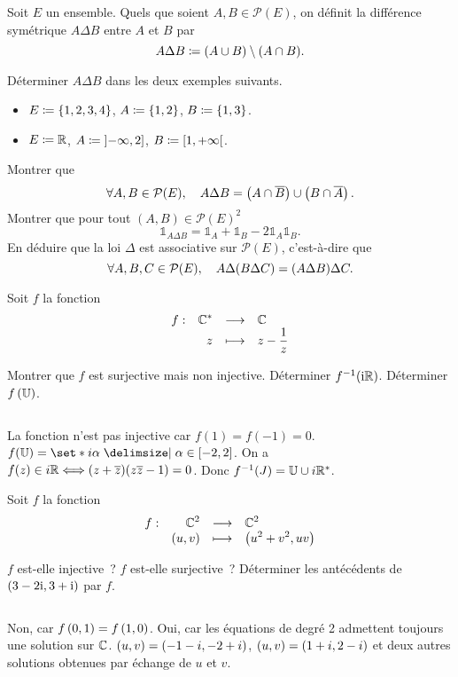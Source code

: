\documentclass{magnolia}
\begin{document}
Soit $E$ un ensemble. Quels que soient $A,B\in\mathcal{P}(E)$, on définit
la différence symétrique $A\Delta B$ entre $A$ et $B$ par
\[A\Delta B\coloneqq(A\cup B)\setminus(A\cap B).\]
\begin{questions}
\question Déterminer $A\Delta B$ dans les deux exemples suivants.
\begin{itemize}
\item $E\coloneqq\left\{1,2,3,4\right\}$, $A\coloneqq\left\{1, 2\right\}$, $B\coloneqq\left\{1, 3\right\}$.
\item $E\coloneqq\mathbb{R}$, $A\coloneqq\left]-\infty,2\right]$, $B\coloneqq\left[1,+\infty\right[$.
\end{itemize}
\question Montrer que
\[\forall A,B\in\mathcal{P}(E),\quad A\Delta B=\left(A\cap\overline{B}\right)\cup\left(B\cap\overline{A}\right).\]
\question Montrer que pour tout $(A,B)\in\mathcal{P}(E)^2$
\[\mathds{1}_{A\Delta B}=\mathds{1}_A + \mathds{1}_B - 2 \mathds{1}_A \mathds{1}_B.\]
\question En déduire que la loi $\Delta$ est associative sur $\mathcal{P}(E)$,
  c'est-à-dire que
	\[\forall A,B,C\in\mathcal{P}(E),\quad A\Delta(B\Delta C)=(A\Delta B)\Delta C.\]
\end{questions}

Soit $f$ la fonction
\[\begin{array}[t]{lrcl} \displaystyle{f} : & \displaystyle{\mathbb{C}^*} & \longrightarrow & \displaystyle{\mathbb{C}} \\ & \displaystyle{z} & \longmapsto & \displaystyle{z-\frac{1}{z}} \end{array}\]
\begin{questions}
\question Montrer que $f$ est surjective mais non injective.
\question Déterminer $f^{-1}({\rm i}\mathbb{R})$.
\question Déterminer $f\p{\U}$.
\end{questions}
\begin{sol}
$\quad$
\begin{questions}
\question La fonction n'est pas injective car $f(1)=f(-1)=0$.
\question $f(\U)=\enstq{i\alpha}{\alpha\in\interf{-2}{2}}$.
\question On a $f(z)\in i\mathbb{R} \Longleftrightarrow (z+\overline{z})(z\overline{z}-1)=0$. Donc
  $f^{-1}(J)=\U\cup i\Rs$.
\end{questions}
\end{sol}

Soit $f$ la fonction
\[\begin{array}[t]{lrcl} \displaystyle{f} : & \displaystyle{\mathbb{C}^2} & \longrightarrow & \displaystyle{\mathbb{C}^2} \\ & \displaystyle{\left(u,v\right)} & \longmapsto & \displaystyle{\left(u^2+v^2,uv\right)} \end{array}\]
\begin{questions}
\question $f$ est-elle injective~?
\question $f$ est-elle surjective~?
\question Déterminer les antécédents de $\left(3-2{\rm i},3+{\rm i}\right)$ par $f$.
\end{questions}
\begin{sol}
$\quad$
\begin{questions}
\question Non, car $f\left(0,1\right)=f\left(1,0\right)$.
\question Oui, car les équations de degré 2 admettent toujours une solution
  sur $\mathbb{C}$.
\question $\left(u,v\right)=\left(-1-i,-2+i\right)$, $\left(u,v\right)=\left(1+i,2-i\right)$ et deux autres
  solutions obtenues par échange de $u$ et $v$.
\end{questions}
\end{sol}
\end{document}
